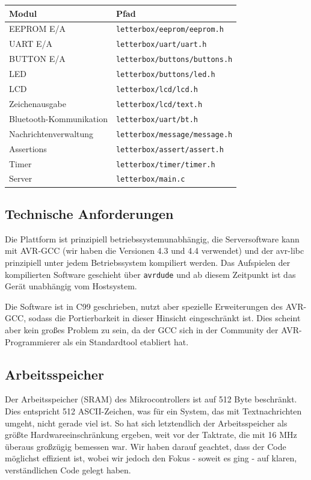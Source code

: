 \documentclass[ngerman]{article}
\begin{document}
\begin{tabular}{|l|l|}
    \hline
    {\bf Modul} & {\bf Pfad} \\
    \hline
    \hline
    EEPROM E/A & {\tt letterbox/eeprom/eeprom.h} \\
    \hline
    UART E/A & {\tt letterbox/uart/uart.h} \\
    \hline
    BUTTON E/A & {\tt letterbox/buttons/buttons.h} \\
    \hline
    LED & {\tt letterbox/buttons/led.h} \\
    \hline
    LCD & {\tt letterbox/lcd/lcd.h} \\
    \hline
    Zeichenausgabe & {\tt letterbox/lcd/text.h} \\
    \hline
    Bluetooth-Kommunikation & {\tt letterbox/uart/bt.h} \\
    \hline
    Nachrichtenverwaltung & {\tt letterbox/message/message.h} \\
    \hline
    Assertions & {\tt letterbox/assert/assert.h} \\
    \hline
    Timer & {\tt letterbox/timer/timer.h} \\
    \hline
    Server & {\tt letterbox/main.c} \\
    \hline
\end{tabular}


\subsection{Technische Anforderungen}

Die Plattform ist prinzipiell betriebssystemunabhängig, die Serversoftware kann mit
AVR-GCC (wir haben die Versionen 4.3 und 4.4 verwendet) und der avr-libc
prinzipiell unter jedem Betriebssystem kompiliert werden. Das Aufspielen der
kompilierten Software geschieht über \texttt{avrdude} und ab diesem Zeitpunkt ist das
Gerät unabhängig vom Hostsystem.

Die Software ist in C99 geschrieben, nutzt aber spezielle Erweiterungen des
AVR-GCC, sodass die Portierbarkeit in dieser Hinsicht eingeschränkt ist. Dies
scheint aber kein großes Problem zu sein, da der GCC sich in der Community der
AVR-Programmierer als ein Standardtool etabliert hat.

\subsection{Arbeitsspeicher}

Der Arbeitsspeicher (SRAM) des Mikrocontrollers ist auf 512 Byte beschränkt.
Dies entspricht 512 ASCII-Zeichen, was für ein System, das mit Textnachrichten
umgeht, nicht gerade viel ist. So hat sich letztendlich der Arbeitsspeicher als
größte Hardwareeinschränkung ergeben, weit vor der Taktrate, die mit 16 MHz
überaus großzügig bemessen war. Wir haben darauf geachtet, dass der Code
möglichst effizient ist, wobei wir jedoch den Fokus - soweit es ging - auf klaren,
verständlichen Code gelegt haben.
\end{document}

